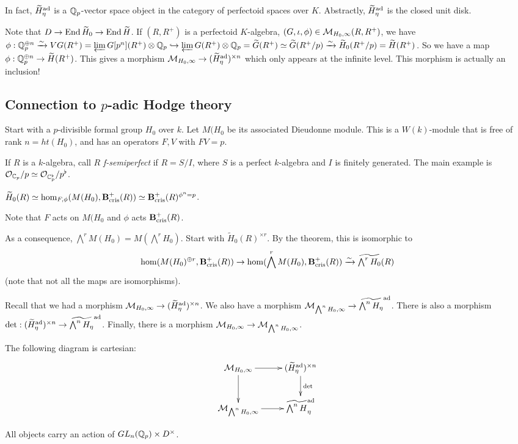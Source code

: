 In fact, $\widetilde H_\eta^{\textnormal{ad}}$ is a $\mathbb{Q}_p$-vector space object in the category 
of perfectoid spaces over $K$. Abstractly, $\widetilde H_\eta^{\textnormal{ad}}$ is the closed 
unit disk. 

Note that $D\to \operatorname{End} \widetilde H_0 \to \operatorname{End}\widetilde H$. If $(R,R^+)$ is a 
perfectoid $K$-algebra, $(G,\iota,\phi)\in \mathcal{M}_{H_0,\infty}(R,R^+)$, we have 
$\phi:\mathbb{Q}_p^{\oplus n} \xrightarrow\sim V G(R^+) = \varprojlim G[p^n](R^+)\otimes \mathbb{Q}_p \hookrightarrow \varprojlim G(R^+) \otimes \mathbb{Q}_p = \widetilde G(R^+) \simeq \widetilde G(R^+/p)\xrightarrow\sim \widetilde H_0(R^+/p) = \widetilde H(R^+)$. 
So we have a map $\phi:\mathbb{Q}_p^{\oplus n} \to \widetilde H(R^+)$. This gives a 
morphism $\mathcal{M}_{H_0,\infty} \to (\widetilde H_\eta^{\textnormal{ad}})^{\times n}$ which only 
appears at the infinite level. This morphism is actually an inclusion! 






\subsection{Connection to \texorpdfstring{$p$}{p}-adic Hodge theory}

Start with a $p$-divisible formal group $H_0$ over $k$. Let $M(H_0$ be its 
associated Dieudonne module. This is a $W(k)$-module that is free of rank 
$n=ht(H_0)$, and has an operators $F,V$ with $F V=p$. 

If $R$ is a $k$-algebra, call $R$ \emph{f-semiperfect} if 
$R=S/I$, where $S$ is a perfect $k$-algebra and $I$ is finitely generated. The 
main example is $\mathcal{O}_{\mathbb{C}_p} / p \simeq \mathcal{O}_{\mathbb{C}_p^\flat} / p^\flat$. 

\begin{theorem}
$\widetilde H_0(R) \simeq \hom_{F,\phi}(M(H_0),\mathbf{B}_\textnormal{cris}^+(R)) \simeq \mathbf{B}_\textnormal{cris}^+(R)^{\phi^n=p}$. 
\end{theorem}


Note that $F$ acts on $M(H_0$ and $\phi$ acts $\mathbf{B}_\textnormal{cris}^+(R)$. 

As a consequence, $\bigwedge^r M(H_0) = M(\bigwedge^r H_0)$. Start with 
$\widetilde H_0(R)^{\times r}$. By the theorem, this is isomorphic to 
\[
  \hom(M(H_0)^{\oplus r}, \mathbf{B}_\textnormal{cris}^+(R)) \to \hom(\bigwedge^r M(H_0), \mathbf{B}_\textnormal{cris}^+(R)) \xrightarrow\sim \widetilde{\textstyle\bigwedge^r H_0}(R) 
\]
(note that not all the maps are isomorphisms). 

Recall that we had a morphism $\mathcal{M}_{H_0,\infty} \to (\widetilde H_\eta^{\textnormal{ad}})^{\times n}$. 
We also have a morphism $\mathcal{M}_{\bigwedge^n H_0,\infty} \to \widetilde{\bigwedge^n H_\eta}^{\textnormal{ad}}$. There is also a morphism 
$\det:(\widetilde H_\eta^{\textnormal{ad}})^{\times n} \to \widetilde{\bigwedge^n H_\eta}^{\textnormal{ad}}$. 
Finally, there is a morphism $\mathcal{M}_{H_0,\infty} \to \mathcal{M}_{\bigwedge^n H_0,\infty}$. 

\begin{theorem}
The following diagram is cartesian:
\[\xymatrix{
  \cM_{H_0,\infty} \ar[r] \ar[d] 
    & (\widetilde H_\eta^\ad)^{\times n} \ar[d]^-{\det} \\
  \cM_{\bigwedge^n H_0,\infty} \ar[r] 
    & \widetilde{\textstyle\bigwedge^n H}_\eta^\ad 
}\]
\end{theorem}

All objects carry an action of $GL_n(\mathbb{Q}_p)\times D^\times$. 
